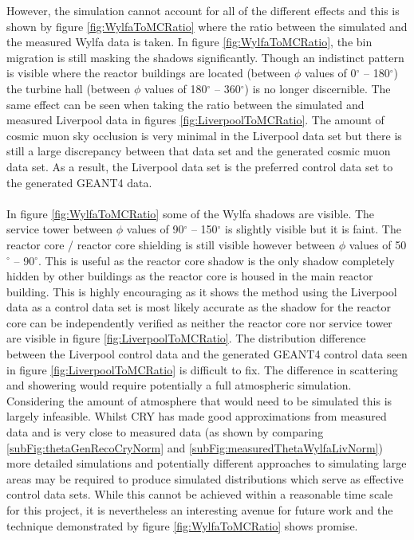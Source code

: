 However, the simulation cannot account for all of the different effects and this is shown by figure \ref{fig:WylfaToMCRatio} where the ratio between the simulated and the measured Wylfa data is taken. In figure \ref{fig:WylfaToMCRatio}, the bin migration is still masking the shadows significantly. Though an indistinct pattern is visible where the reactor buildings are located (between $\phi$ values of 0$^\circ$ -- 180$^\circ$) the turbine hall (between $\phi$ values of 180$^\circ$ -- 360$^\circ$) is no longer discernible. The same effect can be seen when taking the ratio between the simulated and measured Liverpool data in figures \ref{fig:LiverpoolToMCRatio}. The amount of cosmic muon sky occlusion is very minimal in the Liverpool data set but there is still a large discrepancy between that data set and the generated cosmic muon data set. As a result, the Liverpool data set is the preferred control data set to the generated GEANT4 data. 
\\\\ In figure \ref{fig:WylfaToMCRatio} some of the Wylfa shadows are visible. The service tower between $\phi$ values of 90$^\circ$ -- 150$^\circ$ is slightly visible but it is faint. The reactor core / reactor core shielding is still visible however between $\phi$ values of 50$^\circ$ -- 90$^\circ$. This is useful as the reactor core shadow is the only shadow completely hidden by other buildings as the reactor core is housed in the main reactor building. This is highly encouraging as it shows the method using the Liverpool data as a control data set is most likely accurate as the shadow for the reactor core can be independently verified as neither the reactor core nor service tower are visible in figure \ref{fig:LiverpoolToMCRatio}. The distribution difference between the Liverpool control data and the generated GEANT4 control data seen in figure \ref{fig:LiverpoolToMCRatio} is difficult to fix. The difference in scattering and showering would require potentially a full atmospheric simulation. Considering the amount of atmosphere that would need to be simulated this is largely infeasible. Whilst CRY has made good approximations from measured data and is very close to measured data (as shown by comparing \ref{subFig:thetaGenRecoCryNorm} and \ref{subFig:measuredThetaWylfaLivNorm}) more detailed simulations and potentially different approaches to simulating large areas may be required to produce simulated distributions which serve as effective control data sets. While this cannot be achieved within a reasonable time scale for this project, it is nevertheless an interesting avenue for future work and the technique demonstrated by figure \ref{fig:WylfaToMCRatio} shows promise. 

